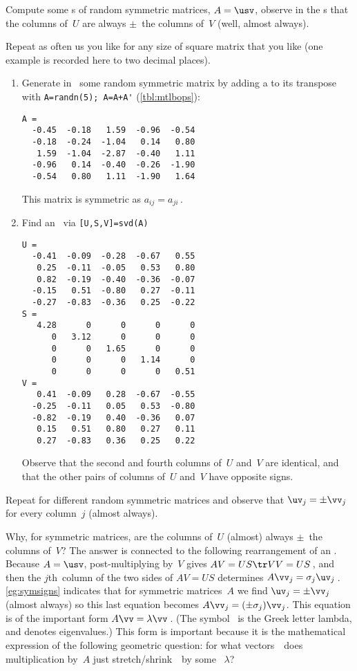 \begin{example} \label{eg:symsigns}
Compute some \svd{}s of random symmetric matrices, \(A=\usv\), observe in the \svd{}s that the columns of~\(U\) are always \(\pm\)~the columns of~\(V\) (well, almost always).
\begin{solution} 
Repeat as often us you like for any size of square matrix that you like  (one example is recorded here to two decimal places).  
\begin{enumerate}
\item Generate in \script\ some random symmetric matrix by adding a 
 to its transpose with \verb|A=randn(5); A=A+A'| (\cref{tbl:mtlbops}):
\setbox\ajrqrbox\hbox{}%
\marginajrbox%
\begin{verbatim}
A =
  -0.45  -0.18   1.59  -0.96  -0.54
  -0.18  -0.24  -1.04   0.14   0.80
   1.59  -1.04  -2.87  -0.40   1.11
  -0.96   0.14  -0.40  -0.26  -1.90
  -0.54   0.80   1.11  -1.90   1.64
\end{verbatim}
This matrix is symmetric as \(a_{ij}=a_{ji}\)\,.
\item Find an \svd\ via \verb|[U,S,V]=svd(A)| \twodp
\begin{verbatim}
U =
  -0.41  -0.09  -0.28  -0.67   0.55
   0.25  -0.11  -0.05   0.53   0.80
   0.82  -0.19  -0.40  -0.36  -0.07
  -0.15   0.51  -0.80   0.27  -0.11
  -0.27  -0.83  -0.36   0.25  -0.22
S =
   4.28      0      0      0      0
      0   3.12      0      0      0
      0      0   1.65      0      0
      0      0      0   1.14      0
      0      0      0      0   0.51
V =
   0.41  -0.09   0.28  -0.67  -0.55
  -0.25  -0.11   0.05   0.53  -0.80
  -0.82  -0.19   0.40  -0.36   0.07
   0.15   0.51   0.80   0.27   0.11
   0.27  -0.83   0.36   0.25   0.22
\end{verbatim}
Observe that the second and fourth columns of~\(U\) and~\(V\) are identical, and that the other pairs of columns of~\(U\) and~\(V\) have opposite signs.
\end{enumerate}
Repeat for different random symmetric matrices and observe that \(\uv_j=\pm \vv_j\) for every column~\(j\) (almost always).
\end{solution}
\end{example}

Why, for symmetric matrices, are the columns of~\(U\) (almost) always \(\pm\)~the columns of~\(V\)?
The answer is connected to the following rearrangement of an \svd.  
Because \(A=\usv\), post-multiplying by~\(V\) gives \(AV=US\tr VV=US\)\,, and then the \(j\)th~column of the two sides of \(AV=US\) determines \(A\vv_j=\sigma_j\uv_j\)\,.
\cref{eg:symsigns} indicates that for symmetric matrices~\(A\) we  find \(\uv_j=\pm\vv_j\) (almost always) so this last equation becomes \(A\vv_j=(\pm \sigma_j)\vv_j\).
This equation is of the important form \(A\vv=\lambda\vv\)\,.
(The symbol~\bfidx{$\lambda$} is the Greek letter lambda, and denotes eigenvalues.)
This form is important because it is the mathematical expression of the following geometric question: for what vectors~\vv\ does multiplication by~\(A\) just stretch\slash shrink~\vv\ by some ~\(\lambda\)?

